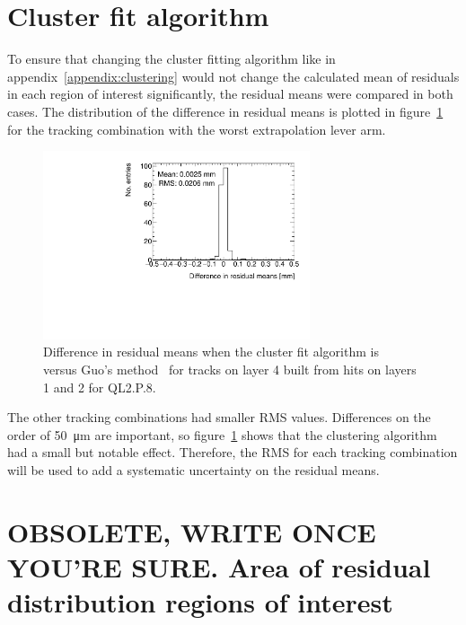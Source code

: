 \section{Cluster fit algorithm}
\label{appendix:systematics_cluster_fit_fcn}
To ensure that changing the cluster fitting algorithm like in appendix~\ref{appendix:clustering} would not change the calculated mean of residuals in each region of interest significantly, the residual means were compared in both cases. The distribution of the difference in residual means is plotted in figure~\ref{fig:cluster_fit_res_mean_compare_fits} for the tracking combination with the worst extrapolation lever arm.

\begin{figure}
    \centering
    \includegraphics[width = 0.7\textwidth]{figures/compare_residual_fits_QL2P08_3100V_2021-06-18_no_dnl_minus_QL2P08_3100V_2021-07-21_no_reclustering_layer4_fixedlayers12.pdf}
    \caption{Difference in residual means when the cluster fit algorithm is ~\cite{hatlo_developments_2005} versus Guo's method~\cite{guo_simple_2011} for tracks on layer 4 built from hits on layers 1 and 2 for QL2.P.8.}
    \label{fig:cluster_fit_res_mean_compare_fits}
\end{figure}

The other tracking combinations had smaller RMS values. Differences on the order of \SI{50}{\micro\meter} are important, so figure~\ref{fig:cluster_fit_res_mean_compare_fits} shows that the clustering algorithm had a small but notable effect. Therefore, the RMS for each tracking combination will be used to add a systematic uncertainty on the residual means.

\section{OBSOLETE, WRITE ONCE YOU'RE SURE. Area of residual distribution regions of interest}
\label{appendix:systematics_bin_size}

